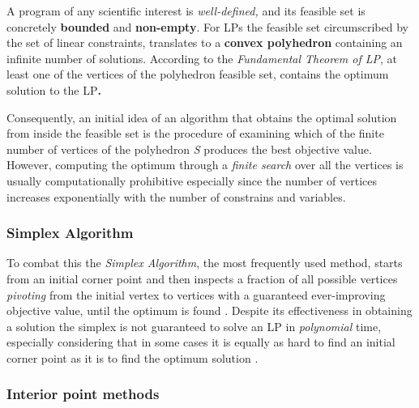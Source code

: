\vspace{\baselineskip}
\noindent
A program of any scientific interest is \textit{well-defined,} and its feasible set is concretely \textbf{bounded} and \textbf{non-empty}. For LPs the feasible set circumscribed by the set of linear constraints, translates to a \textbf{convex polyhedron} containing an infinite number of solutions. According to the \textit{Fundamental Theorem of LP}, at least one of the vertices of the polyhedron feasible set, contains the optimum solution to the LP\textbf{.}\par
\vspace{\baselineskip}
\noindent
Consequently, an initial idea of an algorithm that obtains the optimal solution from inside the feasible set is the procedure of examining which of the finite number of vertices of the polyhedron \textit{S} produces the best objective value. However, computing the optimum through a \textit{finite search} over all the vertices is usually computationally prohibitive especially since the number of vertices increases exponentially with the number of constrains and variables.\par



\subsubsection*{Simplex Algorithm}
To combat this the \textit{Simplex Algorithm}, the most frequently used method, starts from an initial corner point and then inspects a fraction of all possible vertices \textit{pivoting} from the initial vertex to vertices with a guaranteed ever-improving objective value, until the optimum is found \cite{DUMMY:3}. Despite its effectiveness in obtaining a solution the simplex is not guaranteed to solve an LP in \textit{polynomial} time, especially considering that in some cases it is equally as hard to find an initial corner point as it is to find the optimum solution \cite{DUMMY:2}. \par


\subsubsection*{Interior point methods}

